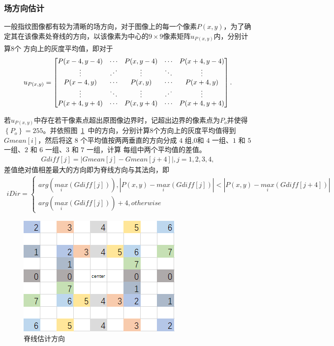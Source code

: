 \documentclass{whutmod}
\newcommand{\udots}{\mathinner{\mskip1mu\raise1pt\vbox{\kern7pt\hbox{.}}  
		\mskip2mu\raise4pt\hbox{.}\mskip2mu\raise7pt\hbox{.}\mskip1mu}}
\newcommand{\upcite}[1]{\textsuperscript{\cite{#1}}}
\begin{document}
\begin{itemize}
\subsubsection{场方向估计}
一般指纹图像都有较为清晰的场方向，对于图像上的每一个像素$P(x,y)$，为了确定其在该像素处脊线的方向，以该像素为中心的$9\times9$像素矩阵$u_{P(x,y)}$内，分别计算$8$个
方向上的灰度平均值\upcite{6}，即对于
\begin{gather*}
	u_{P(x,y)}=\begin{bmatrix}
		P(x-4,y-4) & \cdots  & P(x,y-4) & \cdots  & P(x+4,y-4) \\ 
		\vdots & \udots & \vdots  &  \ddots  & \vdots\\ 
		P(x-4,y) & \cdots & P(x,y) &\cdots& P(x+4,y)  \\ 
		\vdots & \ddots  & \vdots  &  \udots & \vdots\\ 
		P(x+4,y+4) & \cdots & P(x,y+4) &\cdots& P(x+4,y+4)  
	\end{bmatrix}.
\end{gather*}

若$u_{P(x,y)}$中存在若干像素点超出原图像边界时，记超出边界的像素点为$P_o$并使得$\left \{ P_o \right \}=255$。并依照图~\ref{adf}~中的方向，分别计算$8$个方向上的灰度平均值得到$Gmean[i]$，然后将这 $8$ 个平均值按两两垂直的方向分成 $4$ 组,$0 $和 $4$ 一组、$1$ 和 $5$ 一组、$2$ 和 $6$ 一组、$3$ 和 $7$ 一组，计算
每组中两个平均值的差值。
\begin{gather*}
	Gdiff[j]=\left | Gmean[j]-Gmean[j+4] \right |,j=1,2,3,4,
\end{gather*}
差值绝对值相差最大的方向即为脊线方向与其法向，即
\begin{gather*}
	iDir=\left\{\begin{matrix}arg(\underset{i}{max}(Gdiff[j])),\left | P(x,y)-\underset{i}{max}(Gdiff[j]) \right|<\left | P(x,y)-\underset{i}{max}(Gdiff[j+4]) \right|
		\\ arg(\underset{i}{max}(Gdiff[j]))+4,otherwise
	\end{matrix}\right.
\end{gather*}
\begin{figure}[H]
	\centering
	\includegraphics[width=.5\textwidth]{figures/chou.png}
	\caption{脊线估计方向}\label{adf}
\end{figure}   

\end{itemize}
\end{document}
